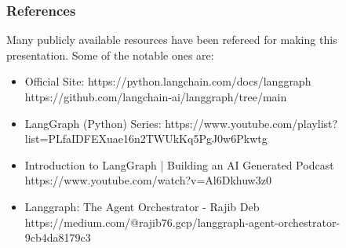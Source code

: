 \begin{frame}\frametitle{References}
Many publicly available resources have been refereed for making this presentation. Some of the notable ones are:
\footnotesize
\begin{itemize}
\item Official Site: https://python.langchain.com/docs/langgraph https://github.com/langchain-ai/langgraph/tree/main
\item LangGraph (Python) Series: https://www.youtube.com/playlist?list=PLfaIDFEXuae16n2TWUkKq5PgJ0w6Pkwtg
\item Introduction to LangGraph | Building an AI Generated Podcast https://www.youtube.com/watch?v=Al6Dkhuw3z0
\item Langgraph: The Agent Orchestrator - Rajib Deb https://medium.com/@rajib76.gcp/langgraph-agent-orchestrator-9cb4da8179c3
\end{itemize}

\end{frame}